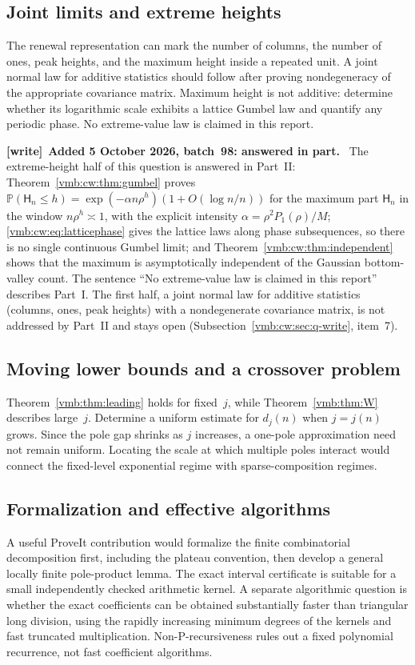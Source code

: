 \documentclass[11pt,a4paper]{article}
\numberwithin{equation}{section}
\theoremstyle{definition}\newtheorem{definition}[theorem]{Definition}
\theoremstyle{remark}\newtheorem{remark}[theorem]{Remark}
\newcommand{\Prob}{\mathbb P}
\newenvironment{writenote}[1][]{\par\smallskip\begingroup\small
 \noindent\textbf{[write]}\if\relax\detokenize{#1}\relax\else~\textbf{#1.}\fi\ }%
 {\par\endgroup\smallskip}
\begin{document}
\subsection{Joint limits and extreme heights}
The renewal representation can mark the number of columns, the number
of ones, peak heights, and the maximum height inside a repeated unit.
A joint normal law for additive statistics should follow after proving
nondegeneracy of the appropriate covariance matrix. Maximum height is
not additive: determine whether its logarithmic scale exhibits a lattice
Gumbel law and quantify any periodic phase. No extreme-value law is
claimed in this report.

\begin{writenote}[Added 5 October 2026, batch~98: answered in part]
The extreme-height half of this question is answered in Part~II:
Theorem~\ref{vmb:cw:thm:gumbel} proves
$\Prob(\mathsf H_n\le h)=\exp(-\alpha n\rho^h)(1+O(\log n/n))$ for the
maximum part $\mathsf H_n$ in the window $n\rho^h\asymp1$, with the explicit
intensity $\alpha=\rho^2P_1(\rho)/M$; \eqref{vmb:cw:eq:latticephase} gives the
lattice laws along phase subsequences, so there is no single continuous
Gumbel limit; and Theorem~\ref{vmb:cw:thm:independent} shows that the maximum
is asymptotically independent of the Gaussian bottom-valley count. The
sentence ``No extreme-value law is claimed in this report'' describes
Part~I. The first half, a joint normal law for additive statistics
(columns, ones, peak heights) with a nondegenerate covariance matrix, is not
addressed by Part~II and stays open
(Subsection~\ref{vmb:cw:sec:q-write}, item~7).
\end{writenote}

\subsection{Moving lower bounds and a crossover problem}
Theorem~\ref{vmb:thm:leading} holds for fixed~\(j\), while
Theorem~\ref{vmb:thm:W} describes large~\(j\). Determine a uniform estimate
for \(d_j(n)\) when \(j=j(n)\) grows. Since the pole gap shrinks as
\(j\) increases, a one-pole approximation need not remain uniform.
Locating the scale at which multiple poles interact would connect the
fixed-level exponential regime with sparse-composition regimes.

\subsection{Formalization and effective algorithms}
A useful ProveIt contribution would formalize the finite combinatorial
decomposition first, including the plateau convention, then develop a
general locally finite pole-product lemma. The exact interval
certificate is suitable for a small independently checked arithmetic
kernel. A separate algorithmic question is whether the exact coefficients
can be obtained substantially faster than triangular long division,
using the rapidly increasing minimum degrees of the kernels and
fast truncated multiplication. Non-P-recursiveness rules out a fixed
polynomial recurrence, not fast coefficient algorithms.
\end{document}
